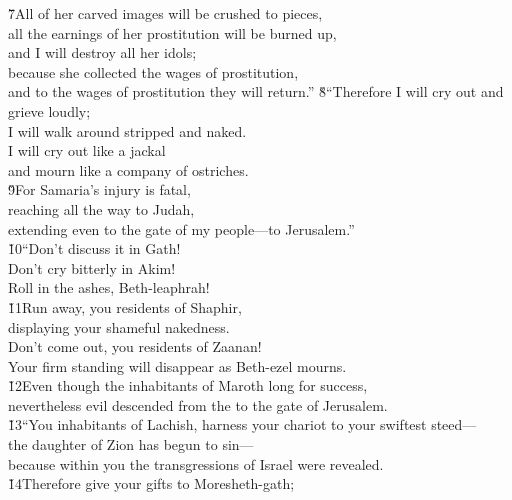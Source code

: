 \begin{poetry}
\poeml \v{7}All of her carved images will be crushed to pieces, \\
\poemll    all the earnings of her prostitution will be burned up, \\
\poemlll       and I will destroy all her idols; \\
\poeml because she collected the wages of prostitution, \\
\poemll    and to the wages of prostitution they will return.''
\poeml \v{8}``Therefore I will cry out and grieve loudly; \\
\poemll    I will walk around stripped and naked. \\
\poeml I will cry out like a jackal \\
\poemll    and mourn like a company of ostriches. \\
\poeml \v{9}For Samaria's injury is fatal, \\
\poemll    reaching all the way to Judah, \\
\poemlll       extending even to the gate of my people---to Jerusalem.'' \\
\poeml \v{10}``Don't discuss it in Gath! \\
\poemll    Don't cry bitterly in Akim! \\
\poemlll       Roll in the ashes, Beth-leaphrah! \\
\poeml \v{11}Run away, you residents of Shaphir, \\
\poemll    displaying your shameful nakedness. \\
\poeml Don't come out, you residents of Zaanan! \\
\poemll    Your firm standing will disappear as Beth-ezel mourns. \\
\poeml \v{12}Even though the inhabitants of Maroth long for success, \\
\poemll    nevertheless evil descended from the  to the gate of Jerusalem. \\
\poeml \v{13}``You inhabitants of Lachish, harness your chariot to your swiftest steed--- \\
\poemll    the daughter of Zion has begun to sin--- \\
\poeml because within you the transgressions of Israel were revealed. \\
\poeml \v{14}Therefore give your gifts to Moresheth-gath; \\

\end{poetry}
